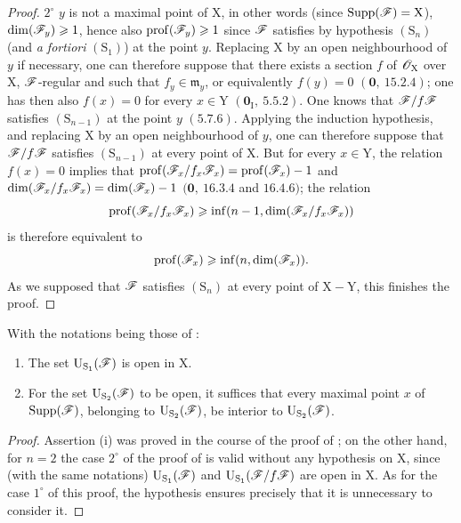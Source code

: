 \begin{proof}
$2^\circ$ $y$ is not a maximal point of $\mathrm{X}$, in other words (since $\operatorname{Supp}(\mathscr{F})=\mathrm{X}$),
$\dim(\mathscr{F}_y)\geqslant 1$, hence also $\operatorname{prof}(\mathscr{F}_y)\geqslant 1$ since $\mathscr{F}$ satisfies by hypothesis $(\mathrm{S}_n)$ (and \emph{a fortiori} $(\mathrm{S}_1)$)
at the point $y$. Replacing $\mathrm{X}$ by an open neighbourhood of $y$ if necessary, one can therefore suppose
that there exists a section $f$ of $\mathscr{O}_\mathrm{X}$ over $\mathrm{X}$, $\mathscr{F}$-regular and such that $f_y\in\mathfrak{m}_y$, or
equivalently $f(y)=0$ $(\mathbf{0},~15.2.4)$; one has then also $f(x)=0$ for every $x\in\mathrm{Y}$ $(\mathbf{0}_\mathrm{I},~5.5.2)$.
One knows that $\mathscr{F}/f\mathscr{F}$ satisfies $(\mathrm{S}_{n-1})$ at the point $y$ $(5.7.6)$. Applying the induction hypothesis,
and replacing $\mathrm{X}$ by an open neighbourhood of $y$, one can therefore
suppose that $\mathscr{F}/f\mathscr{F}$ satisfies $(\mathrm{S}_{n-1})$ at every point of $\mathrm{X}$. But for every $x\in\mathrm{Y}$, the relation
$f(x)=0$ implies that $\operatorname{prof}(\mathscr{F}_x/f_x\mathscr{F}_x)=\operatorname{prof}(\mathscr{F}_x)-1$ and $\dim(\mathscr{F}_x/f_x\mathscr{F}_x)=\dim(\mathscr{F}_x)-1$
$(\mathbf{0},~16.3.4$ and $16.4.6)$; the relation
\[
  \operatorname{prof}(\mathscr{F}_x/f_x\mathscr{F}_x)\geqslant\inf(n- 1,\dim(\mathscr{F}_x/f_x\mathscr{F}_x))
\]
is therefore equivalent to
\[
  \operatorname{prof}(\mathscr{F}_x)\geqslant\inf(n,\dim(\mathscr{F}_x)).
\]
As we supposed that $\mathscr{F}$ satisfies $(\mathrm{S}_n)$ at every point of $\mathrm{X}-\mathrm{Y}$, this finishes the proof.
\end{proof}

\begin{corollary}[6.11.7]
\label{IV.6.11.7}
With the notations being those of :
\begin{enumerate}[label=\textup{(\roman*)}]
  \item The set $\mathrm{U}_{\mathrm{S}_1}(\mathscr{F})$ is open in $\mathrm{X}$.
  \item For the set $\mathrm{U}_{\mathrm{S}_2}(\mathscr{F})$ to be open, it suffices that every maximal point $x$ of $\operatorname{Supp}(\mathscr{F})$,
belonging to $\mathrm{U}_{\mathrm{S}_2}(\mathscr{F})$, be interior to $\mathrm{U}_{\mathrm{S}_2}(\mathscr{F})$.
\end{enumerate}
\end{corollary}

\begin{proof}
Assertion (i) was proved in the course of the proof of ;
on the other hand, for $n=2$ the case $2^\circ$ of the proof of  is valid without any
hypothesis on $\mathrm{X}$, since (with the same notations) $\mathrm{U}_{\mathrm{S}_1}(\mathscr{F})$ and $\mathrm{U}_{\mathrm{S}_1}(\mathscr{F}/f\mathscr{F})$ are open
in $\mathrm{X}$. As for the case $1^\circ$ of this proof, the hypothesis ensures precisely that it
is unnecessary to consider it.
\end{proof}

